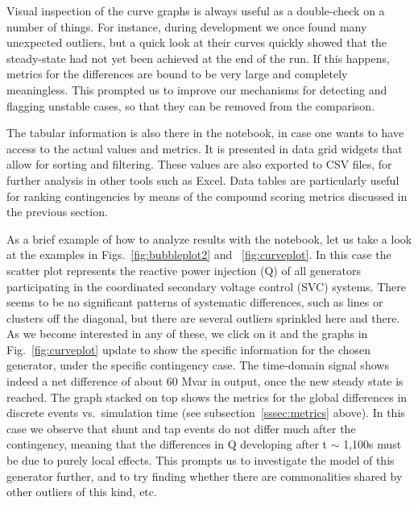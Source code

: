 \documentclass[conference]{IEEEtran}
\begin{document}
Visual inspection of the curve graphs is always useful as a double-check on a
number of things. For instance, during development we once found many unexpected
outliers, but a quick look at their curves quickly showed that the steady-state
had not yet been achieved at the end of the run. If this happens, metrics for
the differences are bound to be very large and completely meaningless.  This
prompted us to improve our mechanisms for detecting and flagging unstable cases,
so that they can be removed from the comparison.

The tabular information is also there in the notebook, in case one wants to have
access to the actual values and metrics. It is presented in data grid widgets
that allow for sorting and filtering.  These values are also exported to CSV
files, for further analysis in other tools such as Excel.  Data tables are
particularly useful for ranking contingencies by means of the compound scoring
metrics discussed in the previous section.

As a brief example of how to analyze results with the notebook, let us take a
look at the examples in Figs.~\ref{fig:bubbleplot2} and ~\ref{fig:curveplot}. In
this case the scatter plot represents the reactive power injection (Q) of all
generators participating in the coordinated secondary voltage control (SVC)
systems. There seems to be no significant patterns of systematic differences,
such as lines or clusters off the diagonal, but there are several outliers
sprinkled here and there.  As we become interested in any of these, we click on
it and the graphs in Fig.~\ref{fig:curveplot} update to show the specific
information for the chosen generator, under the specific contingency case. The
time-domain signal shows indeed a net difference of about 60 Mvar in output,
once the new steady state is reached. The graph stacked on top shows the metrics
for the global differences in discrete events vs.~simulation time (see
subsection~\ref{sssec:metrics} above).  In this case we observe that shunt and
tap events do not differ much after the contingency, meaning that the
differences in Q developing after t $\sim$ 1,100s must be due to purely local
effects. This prompts us to investigate the model of this generator further, and
to try finding whether there are commonalities shared by other outliers of this
kind, etc.
\end{document}
